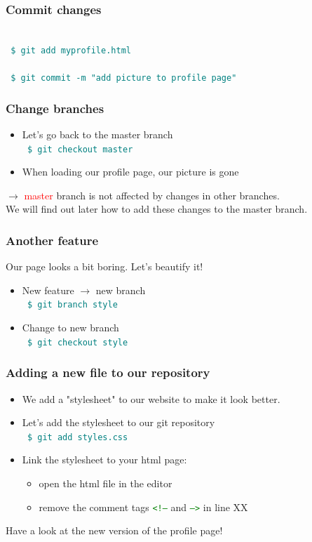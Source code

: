 \documentclass[aspectratio=169]{beamer}
\newcommand{\shellcmd}[1]{~\\ \indent\indent\texttt{\textcolor{teal}{ \$ #1}\\}}
\begin{document}

\begin{frame}
\frametitle{Commit changes}
	\shellcmd{git add myprofile.html}
	\shellcmd{git commit -m "add picture to profile page"}
\end{frame}


\begin{frame}
\frametitle{Change branches}
\begin{itemize}
	\item Let's go back to the master branch \shellcmd{git checkout master}
	\item When loading our profile page, our picture is gone 
\end{itemize}
	$\rightarrow$ \textcolor{red}{master} branch is not affected by changes in other branches.\\
	\hspace{.5cm}We will find out later how to add these changes to the master branch.
\end{frame}


\begin{frame}
\frametitle{Another feature}
	Our page looks a bit boring. Let's beautify it!
\begin{itemize}
	\item New feature $\rightarrow$ new branch \shellcmd{git branch style}
	\item Change to new branch \shellcmd{git checkout style}
\end{itemize}
\end{frame}


\begin{frame}
\frametitle{Adding a new file to our repository}
\begin{itemize}
	\item We add a "stylesheet" to our website to make it look better.
	\item Let's add the stylesheet to our git repository \shellcmd{git add styles.css} 
	\item Link the stylesheet to your html page: 
	\begin{itemize}
		\item open the html file in the editor
		\item remove the comment tags \texttt{\textcolor{green}{<!--}} and \texttt{\textcolor{green}{-->}} in line  XX 
	\end{itemize}
\end{itemize}
Have a look at the new version of the profile page!
\end{frame}
\end{document}

